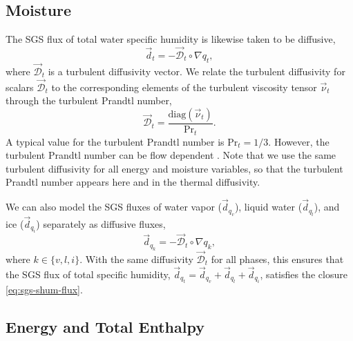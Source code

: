 \documentclass{report}
\begin{document}
\subsection{Moisture}

The SGS flux of total water specific humidity is likewise taken to be diffusive,
\begin{equation}\label{eq:sgs-shum-flux}
\vec{d}_{t} = - \vec{\mathcal{D}}_t \circ \nabla q_t,
\end{equation}
where $\vec{\mathcal{D}}_t$ is a turbulent diffusivity vector. We relate the turbulent diffusivity for scalars $\vec{\mathcal{D}}_t$ to the corresponding elements of the turbulent viscosity tensor $\vec{\nu}_t$ through the turbulent Prandtl number, 
\begin{equation}
\vec{\mathcal{D}}_t = \frac{\mathrm{diag}(\vec{\nu}_t)}{\mathrm{Pr}_{t}}.
\end{equation} 
A typical value for the turbulent Prandtl number is $\mathrm{Pr}_{t} = 1/3$. However, the turbulent Prandtl number can be flow dependent \citep[e.g.,][]{Deardorff80a}. Note that we use the same turbulent diffusivity for all energy and moisture variables, so that the turbulent Prandtl number appears here and in the thermal diffusivity.

We can also model the SGS fluxes of water vapor ($\vec{d}_{q_v}$), liquid water ($\vec{d}_{q_l}$), and ice ($\vec{d}_{q_i}$) separately as diffusive fluxes, 
\begin{equation}\label{e:water_diffusion}
    \vec{d}_{q_k} = - \vec{\mathcal{D}}_t \circ \nabla q_k,
\end{equation}
where $k \in \{v, l, i\}$. With the same diffusivity $\vec{\mathcal{D}}_t$ for all phases, this ensures that the SGS flux of total specific humidity, $\vec{d}_{q_t} = \vec{d}_{q_v} + \vec{d}_{q_l} + \vec{d}_{q_i}$, satisfies the closure \eqref{eq:sgs-shum-flux}.

\subsection{Energy and Total Enthalpy}
\end{document}

